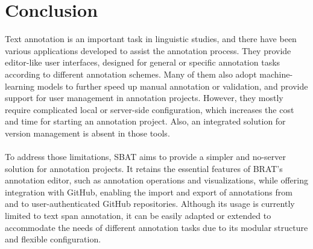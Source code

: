 \documentclass[12ptm a4paper]{article}
\begin{document}
\section{Conclusion}
Text annotation is an important task in linguistic studies, and there have been various applications developed to assist the annotation process. They provide editor-like user interfaces, designed for general or specific annotation tasks according to different annotation schemes. Many of them also adopt machine-learning models to further speed up manual annotation or validation, and provide support for user management in annotation projects. However, they mostly require complicated local or server-side configuration, which increases the cost and time for starting an annotation project. Also, an integrated solution for version management is absent in those tools.\\
\\
To address those limitations, SBAT aims to provide a simpler and no-server solution for annotation projects. It retains the essential features of BRAT's annotation editor, such as annotation operations and visualizations, while offering integration with GitHub, enabling the import and export of annotations from and to user-authenticated GitHub repositories. Although its usage is currently limited to text span annotation, it can be easily adapted or extended to accommodate the needs of different annotation tasks due to its modular structure and flexible configuration.\\ 










\newpage


\end{document}
